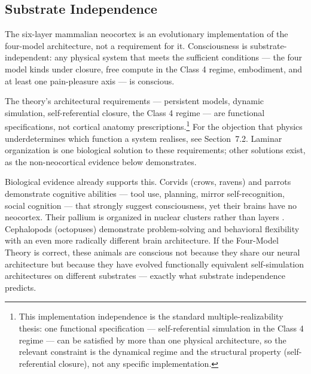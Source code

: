 \documentclass[12pt]{article}
\begin{document}
\subsection{Substrate Independence}


The six-layer mammalian neocortex is an evolutionary implementation of the four-model architecture, not a requirement for it. Consciousness is substrate-independent: any physical system that meets the sufficient conditions --- the four model kinds under closure, free compute in the Class 4 regime, embodiment, and at least one pain-pleasure axis --- is conscious.

The theory's architectural requirements --- persistent models, dynamic simulation, self-referential closure, the Class 4 regime --- are functional specifications, not cortical anatomy prescriptions.\footnote{This implementation independence is the standard multiple-realizability thesis: one functional specification --- self-referential simulation in the Class 4 regime --- can be satisfied by more than one physical architecture, so the relevant constraint is the dynamical regime and the structural property (self-referential closure), not any specific implementation.} For the objection that physics underdetermines which function a system realises, see Section~7.2. Laminar organization is one biological solution to these requirements; other solutions exist, as the non-neocortical evidence below demonstrates.

Biological evidence already supports this. Corvids (crows, ravens) and parrots demonstrate cognitive abilities --- tool use, planning, mirror self-recognition, social cognition --- that strongly suggest consciousness, yet their brains have no neocortex. Their pallium is organized in nuclear clusters rather than layers \citep{Gunturkun2016}. Cephalopods (octopuses) demonstrate problem-solving and behavioral flexibility with an even more radically different brain architecture. If the Four-Model Theory is correct, these animals are conscious not because they share our neural architecture but because they have evolved functionally equivalent self-simulation architectures on different substrates --- exactly what substrate independence predicts.
\end{document}
